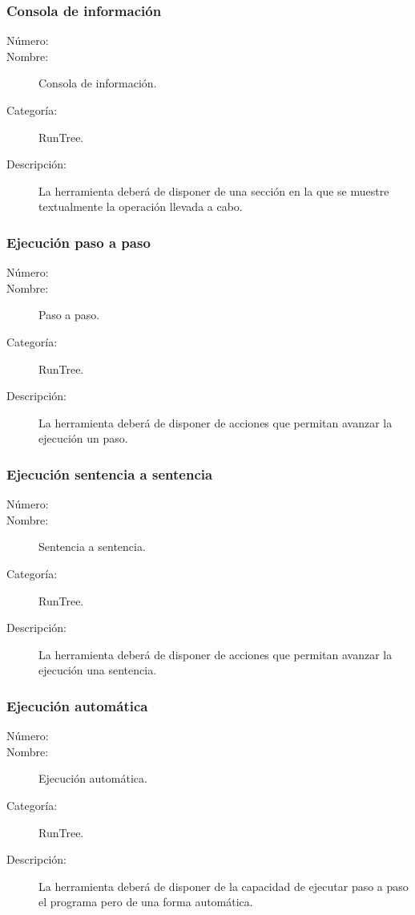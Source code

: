 \subsubsection{Consola de información}
\begin{framed}
	\begin{description}
		\item [Número:] \cn
		\item [Nombre:] Consola de información.
		\item [Categoría:] RunTree.
		\item [Descripción:] La herramienta deberá de disponer de una sección en la que se muestre textualmente la operación llevada a cabo.
	\end {description}
\end{framed}

\subsubsection{Ejecución paso a paso}
\begin{framed}
	\begin{description}
		\item [Número:] \cn
		\item [Nombre:] Paso a paso.
		\item [Categoría:] RunTree.
		\item [Descripción:] La herramienta deberá de disponer de acciones que permitan avanzar la ejecución un paso.
	\end {description}
\end{framed}

\subsubsection{Ejecución sentencia a sentencia}
\begin{framed}
	\begin{description}
		\item [Número:] \cn
		\item [Nombre:] Sentencia a sentencia.
		\item [Categoría:] RunTree.
		\item [Descripción:] La herramienta deberá de disponer de acciones que permitan avanzar la ejecución una sentencia.
	\end {description}
\end{framed}

\subsubsection{Ejecución automática}
\begin{framed}
	\begin{description}
		\item [Número:] \cn
		\item [Nombre:] Ejecución automática.
		\item [Categoría:] RunTree.
		\item [Descripción:] La herramienta deberá de disponer de la capacidad de ejecutar paso a paso el programa pero de una forma automática.
	\end {description}
\end{framed}

